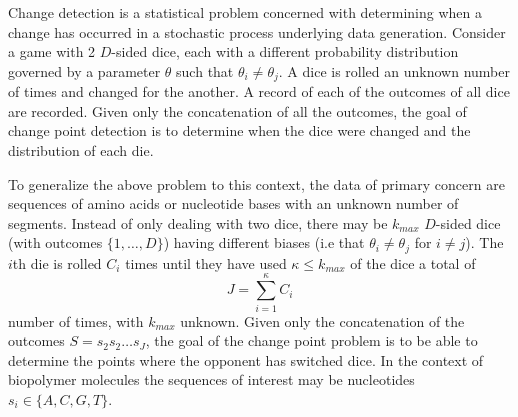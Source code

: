 Change detection is a statistical problem concerned with determining when a change has occurred in a stochastic process underlying data generation. 
Consider a game with 2 $D$-sided dice, each with a different probability distribution governed by a parameter $\theta$ such that $\theta_i \neq \theta_j$. A dice is rolled an unknown number of times and changed for the another. 
A record of each of the outcomes of all dice are recorded. Given only the concatenation of all the outcomes, the goal of change point detection is to determine when the dice were changed and the distribution of each die. 

To generalize the above problem to this context, the data of primary concern are sequences of amino acids or nucleotide bases with an unknown number of segments. 
Instead of only dealing with two dice, there may be $k_{max}$ $D$-sided dice (with outcomes $\{1,\ldots,D\}$) having different biases (i.e that $\theta_i\neq \theta_j$ for $i\neq j$). 
The $i$th die is rolled $C_i$ times until they have used $\kappa\leq k_{max}$ of the dice a total of 
    \begin{equation}
        J = \sum_{i=1}^{\kappa}C_i
    \end{equation}
number of times, with $k_{max}$ unknown. Given only the concatenation of the outcomes $S = s_2s_2\ldots s_J$, the goal of the change point problem is to be able to determine the points where the opponent has switched dice. In the context of biopolymer molecules the sequences of interest may be nucleotides $s_i \in \{A,C,G,T\}$.

